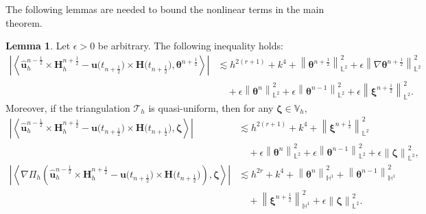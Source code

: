 \documentclass[11pt, reqno]{amsart}
\theoremstyle{definition}
\newtheorem{lemma}[theorem]{Lemma}
\theoremstyle{remark}
\numberwithin{equation}{section}
\newcommand{\bff}{\boldsymbol}
\newcommand{\bb}{\mathbb}
\newcommand{\norm}[2]{\left\|{#1}\right\|_{#2}}
\newcommand{\inpro}[2]{\left\langle#1,#2\right\rangle}
\begin{document}
The following lemmas are needed to bound the nonlinear terms in the main theorem.

\begin{lemma}\label{lem:cross disc}
Let $\epsilon>0$ be arbitrary. The following inequality holds:
\begin{align}
	\label{equ:cross theta est}
	\nonumber
	\left| \inpro{\widehat{\bff{u}}_h^{n-\frac{1}{2}} \times \bff{H}_h^{n+\frac{1}{2}} - \bff{u}\big(t_{n+\frac{1}{2}}\big) \times \bff{H}\big(t_{n+\frac{1}{2}}\big)}{\bff{\theta}^{n+\frac{1}{2}}} \right| 
	&\lesssim
	h^{2(r+1)} + k^4+ \norm{\bff{\theta}^{n+\frac{1}{2}}}{\bb{L}^2}^2 + \epsilon \norm{\nabla \bff{\theta}^{n+\frac{1}{2}}}{\bb{L}^2}^2
	\\
	&\quad
	+ \epsilon \norm{\bff{\theta}^n}{\bb{L}^2}^2 + \epsilon \norm{\bff{\theta}^{n-1}}{\bb{L}^2}^2
	+ \epsilon \norm{\bff{\xi}^{n+\frac{1}{2}}}{\bb{L}^2}^2.
\end{align}
Moreover, if the triangulation $\mathcal{T}_h$ is quasi-uniform, then for any $\bff{\zeta} \in \bb{V}_h$,
\begin{align}\label{equ:cross est}
	\nonumber
	\left| \inpro{\widehat{\bff{u}}_h^{n-\frac{1}{2}} \times \bff{H}_h^{n+\frac{1}{2}} - \bff{u}\big(t_{n+\frac{1}{2}}\big) \times \bff{H}\big(t_{n+\frac{1}{2}}\big)}{\bff{\zeta}} \right| 
	&\lesssim
	h^{2(r+1)} + k^4+ \norm{\bff{\xi}^{n+\frac{1}{2}}}{\bb{L}^2}^2
	\\
	&\quad
	+ \epsilon \norm{\bff{\theta}^n}{\bb{L}^2}^2 + \epsilon \norm{\bff{\theta}^{n-1}}{\bb{L}^2}^2
	+ \epsilon \norm{\bff{\zeta}}{\bb{L}^2}^2,
	\\
	\label{equ:cross nab est crank}
	\left|\inpro{\nabla\Pi_h\left(\widehat{\bff{u}}_h^{n-\frac12} \times \bff{H}_h^{n+\frac12}- \bff{u}\big(t_{n+\frac{1}{2}}\big) \times \bff{H}\big(t_{n+\frac{1}{2}}\big)\right)}{\bff{\zeta}} \right|
	&\lesssim
	h^{2r}
	+
	k^4
	+
	\norm{\bff{\theta}^n}{\bb{H}^1}^2
	+
	\norm{\bff{\theta}^{n-1}}{\bb{H}^1}^2
	\nonumber \\
	&\quad
	+
	\norm{\bff{\xi}^{n+\frac12}}{\bb{H}^1}^2
	+
	\epsilon \norm{\bff{\zeta}}{\bb{L}^2}^2.
\end{align}
\end{lemma}
\end{document}
